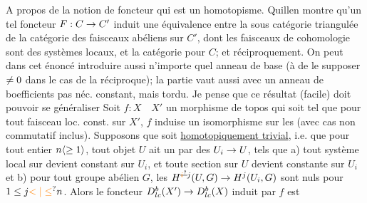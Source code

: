 \margin{\handwritten{\(\Vert\)}}%
A propos de la notion de foncteur qui est un homotopisme. Quillen montre qu'un tel foncteur $F:C\to C'$ induit une équivalence entre la sous catégorie triangulée  de la catégorie  des faisceaux abéliens sur $C'$, dont les faisceaux de cohomologie sont des systèmes locaux, et la catégorie  pour $C$;  et réciproquement.  On peut dans cet énoncé introduire aussi n'importe quel anneau de base (à  de le supposer $\ne0$ dans le cas de la réciproque);  la partie  vaut aussi avec un anneau de boefficients pas néc. constant, mais  tordu. Je pense que ce résultat (facile) doit pouvoir se généraliser  Soit $f:X\quad X'$ un morphisme de topos qui soit tel que pour tout  faisceau loc. const. sur $X'$, $f$ induise un isomorphisme sur les  (avec cas non commutatif inclus). Supposons que   soit \uline{ homotopiquement trivial}, i.e. que  pour tout entier $n\inserted{\handwritten{\geq}1}$, tout objet $U$  ait un  par des $U_i\to U$, tels que a) tout système local sur  devient constant sur $U_i$, et toute section sur $U$ devient constante sur $U_i$ et b) pour tout  groupe abélien $G$, les $H^{\deleted{\unsure{i}}j}(U,G)\handwritten{\to}H^j(U_i,G)$ sont nuls pour $1\handwritten{\leq}j\handwritten{\unsure{<|\leq}}n$.%
 Alors le foncteur $D^b_{lc}(X')\to D^b_{lc}(X)$ induit par $f$ est


